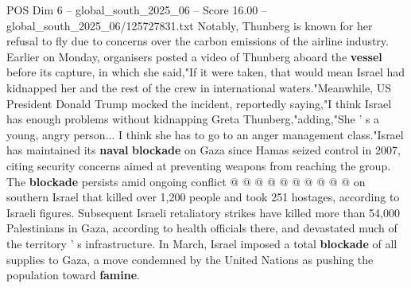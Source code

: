 \begin{textsample}{POS Dim 6 – global\_south\_2025\_06 – Score 16.00 – global\_south\_2025\_06/125727831.txt}
Notably, Thunberg is known for her refusal to fly due to concerns over the carbon emissions of the airline industry.
Earlier on Monday, organisers posted a video of Thunberg aboard the \textbf{vessel} before its capture, in which she said,"If it were taken, that would mean Israel had kidnapped her and the rest of the crew in international waters."Meanwhile, US President Donald Trump mocked the incident, reportedly saying,"I think Israel has enough problems without kidnapping Greta Thunberg,"adding,"She ' s a young, angry person...
I think she has to go to an anger management class."Israel has maintained its \textbf{naval} \textbf{blockade} on Gaza since Hamas seized control in 2007, citing security concerns aimed at preventing weapons from reaching the group.
The \textbf{blockade} persists amid ongoing conflict @ @ @ @ @ @ @ @ @ @ on southern Israel that killed over 1,200 people and took 251 hostages, according to Israeli figures.
Subsequent Israeli retaliatory strikes have killed more than 54,000 Palestinians in Gaza, according to health officials there, and devastated much of the territory ' s infrastructure.
In March, Israel imposed a total \textbf{blockade} of all supplies to Gaza, a move condemned by the United Nations as pushing the population toward \textbf{famine}.

\end{textsample}
